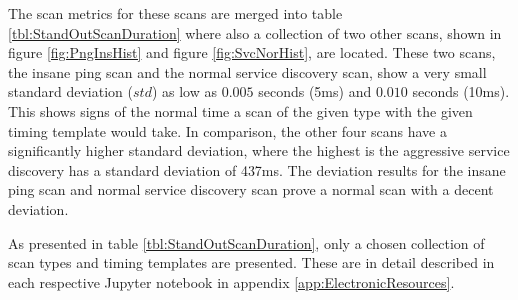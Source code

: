 The scan metrics for these scans are merged into table \ref{tbl:StandOutScanDuration} where also a collection of two other scans, shown in figure \ref{fig:PngInsHist} and figure \ref{fig:SvcNorHist}, are located.
These two scans, the insane ping scan and the normal service discovery scan, show a very small standard deviation ($std$) as low as $0.005$ seconds (5ms) and $0.010$ seconds (10ms). This shows signs of the normal time a scan of the given type with the given timing template would take. In comparison, the other four scans have a significantly higher standard deviation, where the highest is the aggressive service discovery has a standard deviation of 437ms.
The deviation results for the insane ping scan and normal service discovery scan prove a normal scan with a decent deviation.

As presented in table \ref{tbl:StandOutScanDuration}, only a chosen collection of scan types and timing templates are presented. These are in detail described in each respective Jupyter notebook in appendix \ref{app:ElectronicResources}.
